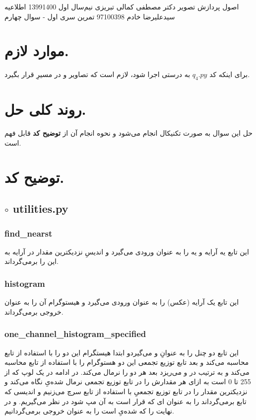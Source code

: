 \documentclass[a4paper,12pt]{article}
\begin{document}
\handout
{اصول پردازش تصویر}
{دکتر مصطفی کمالی تبریزی}
{نیم‌سال اول 1399\lr{-}1400}
{اطلاعیه}
{سیدعلیرضا خادم}
{97100398}
 {تمرین سری اول - سوال چهارم}
\section*{موارد لازم.}\label{n}
برای اینکه کد 
$ q_4.py $
به درستی اجرا شود، لازم است که تصاویر
و
 در مسیرِ 
قرار بگیرد.
\section*{روند کلی حل.}
حل این سوال به صورت تکنیکال انجام می‌شود و نحوه انجام آن از 
\textbf{توضیح کد}
قابل فهم است.
\section*{توضیح کد.}
\subsection*{$\circ$ utilities.py}
\subsubsection*{find\_nearst}
این تابع یه آرایه و یه 
 را به عنوان ورودی می‌گیرد و اندیسِ نزدیکترین مقدار در آرایه به این
 را برمی‌گرداند.
 \subsubsection*{histogram}
 این تابع یک آرایه (عکس) را به عنوان ورودی می‌گیرد و هیستوگرام آن را به عنوان خروجی برمی‌گرداند.
 \subsubsection*{one\_channel\_histogram\_specified}
 این تابع دو چنل را به عنوانِ
 و 
 می‌گیردو ابتدا هیستگرام این دو را با استفاده از تابع
 محاسبه می‌کند و بعد تابع توزیع تجمعی این دو هستوگرام را با استفاده از تابع 
 محاسبه می‌کند و به ترتیب  در
 و 
 می‌ریزد بعد هر دو را نرمال می‌کند. در ادامه در یک لوپ که از 255 تا 0 است به ازای هر 
 مقدارش را در تابع توزیع تجمعی نرمال شده‌یِ 
 نگاه می‌کند و نزدیکترین مقدار را در تابع توزیع تجمعیِ
 با استفاده از تابع 
 سرچ می‌زنیم و اندیسی که تابع 
 برمی‌گرداند را به عنوان 
 ای که قرار است به آن مپ شود در نظر می‌گیریم. و در نهایت 
  را که 
  شده‌یِ 
  است را به عنوان خروجی برمی‌گردانیم.
\end{document}
